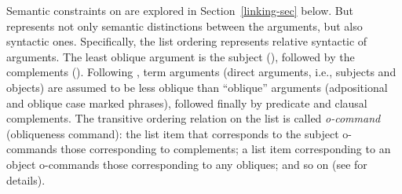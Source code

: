 \documentclass[output=paper
 	        ,biblatex
                ,babelshorthands
                ,newtxmath
                ,draftmode
                ,colorlinks, citecolor=brown
]{langscibook}
\begin{document}
Semantic constraints on \argst are explored in Section~\ref{linking-sec} below.  But \argst represents not only
semantic distinctions between the arguments, but also  %
syntactic  ones.  Specifically, the list ordering represents relative syntactic 
of arguments.   The least oblique argument is the subject (\subj), followed by the complements
(\comps).  Following \citet{Manning1996}, term arguments (direct arguments, i.e., subjects and
objects) are  assumed to be less oblique than ``oblique'' arguments (adpositional and oblique case
marked phrases), followed finally by predicate and clausal complements.  The transitive ordering
relation on the \argst list is called \textit{o-command} (obliqueness
command): the list item that corresponds to the
subject o-commands those corresponding to complements; a list item corresponding to an object
o-commands those corresponding to any obliques; and so on (see
 for details). 
 
%
%
\end{document}

